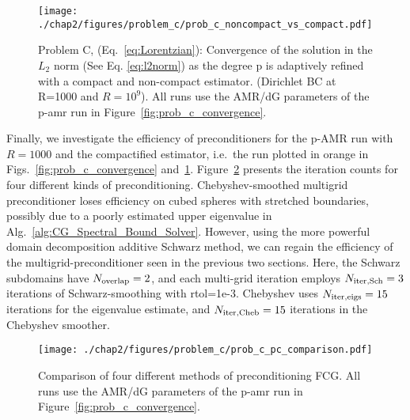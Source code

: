 \begin{figure}
  \centering
  \texttt{[image: ./chap2/figures/problem\_c/prob\_c\_noncompact\_vs\_compact.pdf]}
  \caption{ \label{fig:prob_c_noncompact_vs_compact} Problem C,
    (Eq.~\ref{eq:Lorentzian}): Convergence of the solution in the
    $L_2$ norm (See Eq. \ref{eq:l2norm}) as the degree p is adaptively
    refined with a compact and non-compact estimator.  (Dirichlet BC
    at R=1000 and $R=10^9$).  All runs use the AMR/dG parameters of
    the p-amr run in Figure~\ref{fig:prob_c_convergence}.  }
\end{figure}


Finally, we investigate the efficiency of preconditioners for the
p-AMR run with $R=1000$ and the compactified estimator, i.e.\ the run plotted in orange in Figs.~\ref{fig:prob_c_convergence}
  and~\ref{fig:prob_c_noncompact_vs_compact}.
Figure~\ref{fig:prob_c_pc_comparison} presents the iteration counts
for four different kinds of preconditioning.
Chebyshev-smoothed multigrid
preconditioner loses
  efficiency on cubed spheres with stretched boundaries, possibly due
to a poorly estimated upper eigenvalue in
Alg.~\ref{alg:CG_Spectral_Bound_Solver}. However, using the more
powerful domain decomposition additive Schwarz method, we can regain
the efficiency of the multigrid-preconditioner seen in the previous
two sections.  Here, the Schwarz subdomains have $N_{\rm
    overlap}=2$, and each multi-grid iteration employs $N_{\rm iter,
    Sch}=3$ iterations of Schwarz-smoothing with rtol=1e-3.  Chebyshev
  uses $N_{\rm iter,eigs}=15$ iterations for the eigenvalue estimate,
  and $N_{\rm iter,Cheb}=15$ iterations in the Chebyshev smoother.


\begin{figure}
  \centering
  \texttt{[image: ./chap2/figures/problem\_c/prob\_c\_pc\_comparison.pdf]}
  \caption{ \label{fig:prob_c_pc_comparison} Comparison of four
    different methods of preconditioning FCG.  All runs use the AMR/dG
    parameters of the p-amr run in
    Figure~\ref{fig:prob_c_convergence}.
  }
\end{figure}



